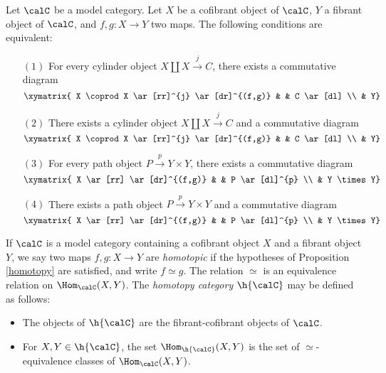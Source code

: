 \begin{proposition}\label{homotopy}
Let $\calC$ be a model category. Let $X$ be a cofibrant object of $\calC$, $Y$ a fibrant object of $\calC$, and $f,g: X \rightarrow Y$ two maps. The following conditions are equivalent:
\begin{itemize}
\item[$(1)$] For every cylinder object $X \coprod X \stackrel{j}{\rightarrow} C$, there exists a commutative diagram
$$ \xymatrix{ X \coprod X \ar[rr]^{j} \ar[dr]^{(f,g)} & & C \ar[dl] \\
 & Y}$$

\item[$(2)$] There exists a cylinder object $X \coprod X \stackrel{j}{\rightarrow} C$ and a commutative diagram
$$ \xymatrix{ X \coprod X \ar[rr]^{j} \ar[dr]^{(f,g)} & & C \ar[dl] \\
 & Y}$$

\item[$(3)$] For every path object $P \stackrel{p}{\rightarrow} Y \times Y$, there exists a commutative diagram $$ \xymatrix{ X  \ar[rr] \ar[dr]^{(f,g)} & & P \ar[dl]^{p} \\
 & Y \times Y}$$

\item[$(4)$] There exists a path object $P \stackrel{p}{\rightarrow} Y \times Y$ and a commutative diagram $$ \xymatrix{ X  \ar[rr] \ar[dr]^{(f,g)} & & P \ar[dl]^{p} \\
 & Y \times Y}$$
\end{itemize}
\end{proposition}

If $\calC$ is a model category containing a cofibrant object $X$ and a fibrant object $Y$, we say two maps $f,g: X \rightarrow Y$ are {\it homotopic} if the hypotheses of Proposition \ref{homotopy} are satisfied, and write $f \simeq g$. The relation $\simeq$ is an equivalence relation on $\Hom_{\calC}(X,Y)$. The {\it homotopy category} $\h{\calC}$ may be defined as follows:

\begin{itemize}
\item The objects of $\h{\calC}$ are the fibrant-cofibrant objects of $\calC$.
\item For $X,Y \in \h{\calC}$, the set $\Hom_{\h{\calC}}(X,Y)$ is the set of $\simeq$-equivalence classes
of $\Hom_{\calC}(X,Y)$.
\end{itemize}

